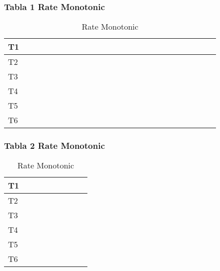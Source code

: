 \documentclass[xcolor=table]{beamer}
\begin{document}
\begin{frame} 
\frametitle{Tabla  1 Rate Monotonic } 
\begin{table} 
\centering 
\begin{tabular}{|l|l|l|l|l|l|l|l|l|l|l|l|l|l|l|l|l|l|l|l|l|l|l|l|l|} 
\hline 
T1 & \cellcolor{blue} & \cellcolor{blue} & \cellcolor{blue} & \cellcolor{blue} & \cellcolor{blue} & & & & & & & & & & & & & & & & & & & \\ \hline 
T2 & & & & & & \cellcolor{red} & \cellcolor{red} & \cellcolor{red} & \cellcolor{red} & \cellcolor{red} & \cellcolor{red} & \cellcolor{red} & \cellcolor{red} & \cellcolor{red} & \cellcolor{red} & & & & & & & & & \\ \hline 
T3 & & & & & & & & & & & & & & & & \cellcolor{green} & \cellcolor{green} & \cellcolor{green} & \cellcolor{green} & & & & & \\ \hline 
T4 & & & & & & & & & & & & & & & & & & & & \cellcolor{gray} & \cellcolor{gray} & \cellcolor{gray} & \cellcolor{gray} & \cellcolor{gray} \\ \hline 
T5 & & & & & & & & & & & & & & & & & & & & & & & & \\ \hline 
T6 & & & & & & & & & & & & & & & & & & & & & & & & \\ \hline 
\end{tabular} 
\caption{ Rate Monotonic } 
\end{table} 
\end{frame} 
\begin{frame} 
\frametitle{Tabla  2 Rate Monotonic } 
\begin{table} 
\centering 
\begin{tabular}{|l|l|l|l|l|l|l|l|l|} 
\hline 
T1 & & & & & & & & \\ \hline 
T2 & & & & & & & & \\ \hline 
T3 & & & & & & & & \\ \hline 
T4 & \cellcolor{gray} & & & & & & & \\ \hline 
T5 & & \cellcolor{yellow} & \cellcolor{yellow} & \cellcolor{yellow} & & & & \\ \hline 
T6 & & & & & \cellcolor{orange} & \cellcolor{orange} & & \\ \hline 
\end{tabular} 
\caption{ Rate Monotonic } 
\end{table} 
\end{frame} 
\end{document}
